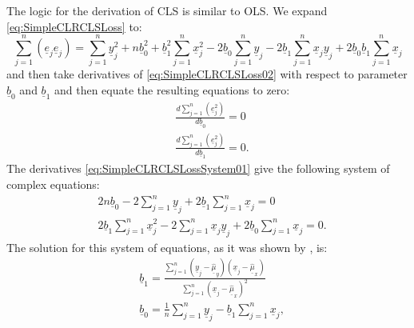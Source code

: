 \documentclass[
]{book}
\begin{document}
The logic for the derivation of CLS is similar to OLS. We expand \eqref{eq:SimpleCLRCLSLoss} to:
\begin{equation}
    \sum_{j=1}^n (\underline{e}_j \underline{e}_j) = \sum_{j=1}^n \underline{y}_j^2 + n \underline{b}_0^2 + \underline{b}_1^2 \sum_{j=1}^n \underline{x}_j^2 - 2 \underline{b}_0 \sum_{j=1}^n \underline{y}_j - 2 \underline{b}_1 \sum_{j=1}^n \underline{x}_j \underline{y}_j + 2 \underline{b}_0 \underline{b}_1 \sum_{j=1}^n \underline{x}_j 
    \label{eq:SimpleCLRCLSLoss02}
\end{equation}
and then take derivatives of \eqref{eq:SimpleCLRCLSLoss02} with respect to parameter \(\underline{b}_0\) and \(\underline{b}_1\) and then equate the resulting equations to zero:
\begin{equation}
    \begin{aligned}
        & \frac{d \sum_{j=1}^n (\underline{e}_j^2)}{d \underline{b}_0} = 0 \\
        & \frac{d \sum_{j=1}^n (\underline{e}_j^2)}{d \underline{b}_1} = 0 .
    \end{aligned}
    \label{eq:SimpleCLRCLSLossSystem01}
\end{equation}
The derivatives \eqref{eq:SimpleCLRCLSLossSystem01} give the following system of complex equations:
\begin{equation}
    \begin{aligned}
        & 2 n \underline{b}_0 - 2 \sum_{j=1}^n \underline{y}_j + 2 \underline{b}_1 \sum_{j=1}^n \underline{x}_j = 0 \\
        & 2 \underline{b}_1 \sum_{j=1}^n \underline{x}_j^2 - 2 \sum_{j=1}^n \underline{x}_j \underline{y}_j + 2 \underline{b}_0 \sum_{j=1}^n \underline{x}_j = 0 .
    \end{aligned}
    \label{eq:SimpleCLRCLSLossSystem02}
\end{equation}
The solution for this system of equations, as it was shown by \citet{Svetunkov2012}, is:
\begin{equation}
    \begin{aligned}
        & \underline{b}_1 = \frac{\sum_{j=1}^n (\underline{y}_{j}-\underline{\hat{\mu}}_{y}) (\underline{x}_j-\underline{\hat{\mu}}_{x})}{\sum_{j=1}^n (\underline{x}_j-\underline{\hat{\mu}}_{x})^2} \\
        & \underline{b}_0 = \frac{1}{n} \sum_{j=1}^n \underline{y}_j - \underline{b}_1 \sum_{j=1}^n \underline{x}_j ,
    \end{aligned}
    \label{eq:SimpleCLRCLSLossParameters}
\end{equation}
\end{document}
